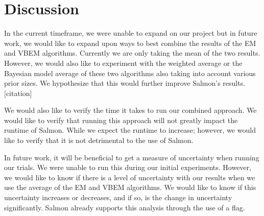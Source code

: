 \section{Discussion}

In the current timeframe, we were unable to expand on our project but in future work, we would like to expand upon ways to best combine the results of the EM and VBEM algorithms. Currently we are only taking the mean of the two results. However, we would also like to experiment with the weighted average or the Bayesian model average of these two algorithms also taking into account various prior sizes. We hypothesize that this would further improve Salmon’s results. [citation]

We would also like to verify the time it takes to run our combined approach. We would like to verify that running this approach will not greatly impact the runtime of Salmon. While we expect the runtime to increase; however, we would like to verify that it is not detrimental to the use of Salmon. 

In future work, it will be beneficial to get a measure of uncertainty when running our trials. We were unable to run this during our initial experiments. However, we would like to know if there is a level of uncertainty with our results when we use the average of the EM and VBEM algorithms. We would like to know if this uncertainty increases or decreases, and if so, is the change in uncertainty significantly. Salmon already supports this analysis through the use of a flag. 
